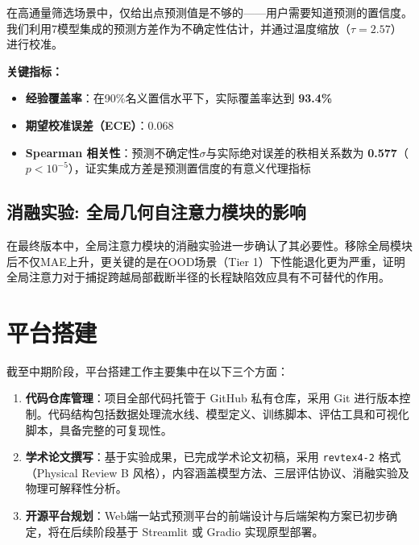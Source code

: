 在高通量筛选场景中，仅给出点预测值是不够的——用户需要知道预测的置信度。我们利用7模型集成的预测方差作为不确定性估计，并通过温度缩放（$\tau = 2.57$）进行校准。

\textbf{关键指标：}
\begin{itemize}
    \item \textbf{经验覆盖率}：在90\%名义置信水平下，实际覆盖率达到 \textbf{93.4\%}
    \item \textbf{期望校准误差（ECE）}：0.068
    \item \textbf{Spearman 相关性}：预测不确定性$\sigma$与实际绝对误差的秩相关系数为 \textbf{0.577}（$p < 10^{-5}$），证实集成方差是预测置信度的有意义代理指标
\end{itemize}

\subsection{消融实验: 全局几何自注意力模块的影响}

在最终版本中，全局注意力模块的消融实验进一步确认了其必要性。移除全局模块后不仅MAE上升，更关键的是在OOD场景（Tier 1）下性能退化更为严重，证明全局注意力对于捕捉跨越局部截断半径的长程缺陷效应具有不可替代的作用。

\section{平台搭建}

截至中期阶段，平台搭建工作主要集中在以下三个方面：

\begin{enumerate}
    \item \textbf{代码仓库管理}：项目全部代码托管于 GitHub 私有仓库，采用 Git 进行版本控制。代码结构包括数据处理流水线、模型定义、训练脚本、评估工具和可视化脚本，具备完整的可复现性。

    \item \textbf{学术论文撰写}：基于实验成果，已完成学术论文初稿，采用 \texttt{revtex4-2} 格式（Physical Review B 风格），内容涵盖模型方法、三层评估协议、消融实验及物理可解释性分析。

    \item \textbf{开源平台规划}：Web端一站式预测平台的前端设计与后端架构方案已初步确定，将在后续阶段基于 Streamlit 或 Gradio 实现原型部署。
\end{enumerate}

